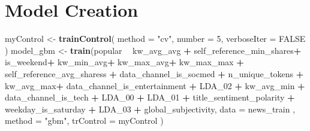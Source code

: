 \documentclass[]{article}
\newenvironment{Shaded}{\begin{snugshade}}{\end{snugshade}}
\newcommand{\DataTypeTok}[1]{\textcolor[rgb]{0.13,0.29,0.53}{#1}}
\newcommand{\DecValTok}[1]{\textcolor[rgb]{0.00,0.00,0.81}{#1}}
\newcommand{\KeywordTok}[1]{\textcolor[rgb]{0.13,0.29,0.53}{\textbf{#1}}}
\newcommand{\NormalTok}[1]{#1}
\newcommand{\OperatorTok}[1]{\textcolor[rgb]{0.81,0.36,0.00}{\textbf{#1}}}
\newcommand{\OtherTok}[1]{\textcolor[rgb]{0.56,0.35,0.01}{#1}}
\newcommand{\StringTok}[1]{\textcolor[rgb]{0.31,0.60,0.02}{#1}}
\begin{document}
\hypertarget{model-creation}{%
\section{Model Creation}\label{model-creation}}

\begin{Shaded}
\begin{Highlighting}[]
\NormalTok{myControl <-}\StringTok{ }\KeywordTok{trainControl}\NormalTok{(}
  \DataTypeTok{method =} \StringTok{"cv"}\NormalTok{,}
  \DataTypeTok{number =} \DecValTok{5}\NormalTok{,}
  \DataTypeTok{verboseIter =} \OtherTok{FALSE}
\NormalTok{)}
\NormalTok{model_gbm <-}\StringTok{ }\KeywordTok{train}\NormalTok{(popular }\OperatorTok{~}\StringTok{ }\NormalTok{kw_avg_avg }\OperatorTok{+}
\StringTok{                      }\NormalTok{self_reference_min_shares}\OperatorTok{+}
\StringTok{                      }\NormalTok{is_weekend}\OperatorTok{+}
\StringTok{                      }\NormalTok{kw_min_avg}\OperatorTok{+}
\StringTok{                      }\NormalTok{kw_max_avg}\OperatorTok{+}
\StringTok{                      }\NormalTok{kw_max_max    }\OperatorTok{+}
\StringTok{                      }\NormalTok{self_reference_avg_sharess    }\OperatorTok{+}
\StringTok{                      }\NormalTok{data_channel_is_socmed    }\OperatorTok{+}
\StringTok{                      }\NormalTok{n_unique_tokens       }\OperatorTok{+}
\StringTok{                      }\NormalTok{kw_avg_max}\OperatorTok{+}
\StringTok{                      }\NormalTok{data_channel_is_entertainment }\OperatorTok{+}
\StringTok{                      }\NormalTok{LDA_}\DecValTok{02}    \OperatorTok{+}
\StringTok{                      }\NormalTok{kw_avg_min    }\OperatorTok{+}
\StringTok{                      }\NormalTok{data_channel_is_tech  }\OperatorTok{+}
\StringTok{                      }\NormalTok{LDA_}\DecValTok{00}        \OperatorTok{+}
\StringTok{                      }\NormalTok{LDA_}\DecValTok{01}        \OperatorTok{+}
\StringTok{                      }\NormalTok{title_sentiment_polarity  }\OperatorTok{+}
\StringTok{                      }\NormalTok{weekday_is_saturday   }\OperatorTok{+}
\StringTok{                      }\NormalTok{LDA_}\DecValTok{03} \OperatorTok{+}
\StringTok{                      }\NormalTok{global_subjectivity,}
                     \DataTypeTok{data =}\NormalTok{ news_train ,}
                     \DataTypeTok{method =} \StringTok{"gbm"}\NormalTok{,}
                     \DataTypeTok{trControl =}\NormalTok{ myControl}
\NormalTok{                   )}
\end{Highlighting}
\end{Shaded}
\end{document}
